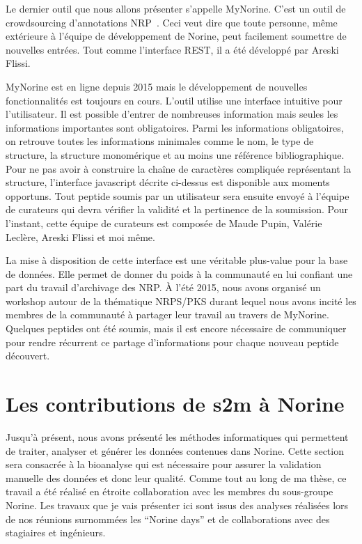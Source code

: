 Le dernier outil que nous allons présenter s'appelle MyNorine.
C'est un outil de crowdsourcing d'annotations NRP~\cite{flissi_norine_2016}.
Ceci veut dire que toute personne, même extérieure à l'équipe de développement de Norine, peut facilement soumettre de nouvelles entrées.
Tout comme l'interface REST, il a été développé par Areski Flissi.

MyNorine est en ligne depuis 2015 mais le développement de nouvelles fonctionnalités est toujours en cours.
L'outil utilise une interface intuitive pour l'utilisateur.
Il est possible d'entrer de nombreuses information mais seules les informations importantes sont obligatoires.
Parmi les informations obligatoires, on retrouve toutes les informations minimales comme le nom, le type de structure, la structure monomérique et au moins une référence bibliographique.
Pour ne pas avoir à construire la chaîne de caractères compliquée représentant la structure, l'interface javascript décrite ci-dessus est disponible aux moments opportuns.
Tout peptide soumis par un utilisateur sera ensuite envoyé à l'équipe de curateurs qui devra vérifier la validité et la pertinence de la soumission.
Pour l'instant, cette équipe de curateurs est composée de Maude Pupin, Valérie Leclère, Areski Flissi et moi même.

La mise à disposition de cette interface est une véritable plus-value pour la base de données.
Elle permet de donner du poids à la communauté en lui confiant une part du travail d'archivage des NRP.
À l'été 2015, nous avons organisé un workshop autour de la thématique NRPS/PKS durant lequel nous avons incité les membres de la communauté à partager leur travail au travers de MyNorine.
Quelques peptides ont été soumis, mais il est encore nécessaire de communiquer pour rendre récurrent ce partage d'informations pour chaque nouveau peptide découvert.









\section{Les contributions de s2m à Norine}
\label{cont_nor}

Jusqu'à présent, nous avons présenté les méthodes informatiques qui permettent de traiter, analyser et générer les données contenues dans Norine.
Cette section sera consacrée à la bioanalyse qui est nécessaire pour assurer la validation manuelle  des données et donc leur qualité.
Comme tout au long de ma thèse, ce travail a été réalisé en étroite collaboration avec les membres du sous-groupe Norine.
Les travaux que je vais présenter ici sont issus des analyses réalisées lors de nos réunions surnommées les ``Norine days'' et de collaborations avec des stagiaires et ingénieurs.


